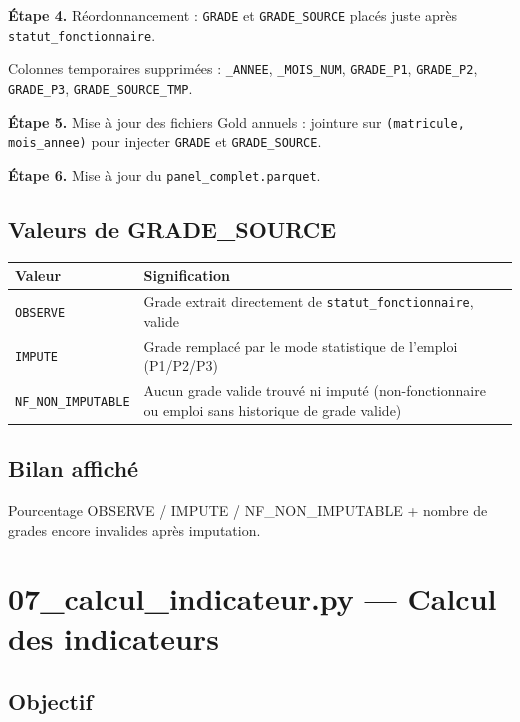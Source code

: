 \documentclass[12pt,a4paper,french]{report}
\newcommand{\colname}[1]{\texttt{#1}}
\begin{document}
\textbf{Étape 4.} Réordonnancement : \colname{GRADE} et
\colname{GRADE\_SOURCE} placés juste après \texttt{statut\_fonctionnaire}.

Colonnes temporaires supprimées : \texttt{\_ANNEE}, \texttt{\_MOIS\_NUM},
\texttt{GRADE\_P1}, \texttt{GRADE\_P2}, \texttt{GRADE\_P3},
\texttt{GRADE\_SOURCE\_TMP}.

\textbf{Étape 5.} Mise à jour des fichiers Gold annuels : jointure sur
\texttt{(matricule, mois\_annee)} pour injecter \colname{GRADE} et
\colname{GRADE\_SOURCE}.

\textbf{Étape 6.} Mise à jour du \texttt{panel\_complet.parquet}.

\subsection{Valeurs de GRADE\_SOURCE}

\begin{tabularx}{\textwidth}{lX}
  \toprule
  \textbf{Valeur} & \textbf{Signification} \\
  \midrule
  \texttt{OBSERVE} & Grade extrait directement de \texttt{statut\_fonctionnaire},
    valide \\
  \texttt{IMPUTE} & Grade remplacé par le mode statistique de l'emploi (P1/P2/P3) \\
  \texttt{NF\_NON\_IMPUTABLE} & Aucun grade valide trouvé ni imputé
    (non-fonctionnaire ou emploi sans historique de grade valide) \\
  \bottomrule
\end{tabularx}

\subsection{Bilan affiché}

Pourcentage OBSERVE / IMPUTE / NF\_NON\_IMPUTABLE + nombre de grades encore
invalides après imputation.

\section{07\_calcul\_indicateur.py — Calcul des indicateurs}

\subsection{Objectif}
\end{document}
